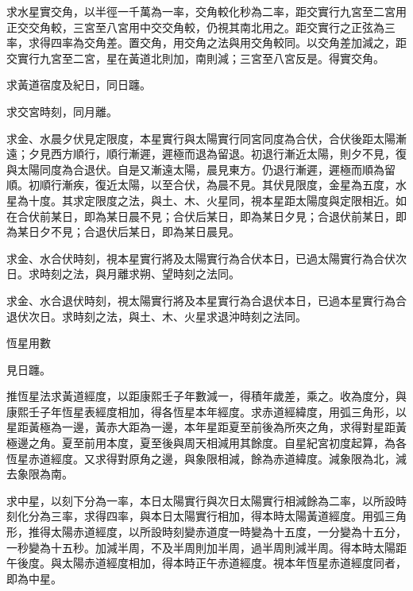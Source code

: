 \begin{pinyinscope}
求水星實交角，以半徑一千萬為一率，交角較化秒為二率，距交實行九宮至二宮用正交交角較，三宮至八宮用中交交角較，仍視其南北用之。距交實行之正弦為三率，求得四率為交角差。置交角，用交角之法與用交角較同。以交角差加減之，距交實行九宮至二宮，星在黃道北則加，南則減；三宮至八宮反是。得實交角。

求黃道宿度及紀日，同日躔。

求交宮時刻，同月離。

求金、水晨夕伏見定限度，本星實行與太陽實行同宮同度為合伏，合伏後距太陽漸遠；夕見西方順行，順行漸遲，遲極而退為留退。初退行漸近太陽，則夕不見，復與太陽同度為合退伏。自是又漸遠太陽，晨見東方。仍退行漸遲，遲極而順為留順。初順行漸疾，復近太陽，以至合伏，為晨不見。其伏見限度，金星為五度，水星為十度。其求定限度之法，與土、木、火星同，視本星距太陽度與定限相近。如在合伏前某日，即為某日晨不見；合伏后某日，即為某日夕見；合退伏前某日，即為某日夕不見；合退伏后某日，即為某日晨見。

求金、水合伏時刻，視本星實行將及太陽實行為合伏本日，已過太陽實行為合伏次日。求時刻之法，與月離求朔、望時刻之法同。

求金、水合退伏時刻，視太陽實行將及本星實行為合退伏本日，已過本星實行為合退伏次日。求時刻之法，與土、木、火星求退沖時刻之法同。

恆星用數

見日躔。

推恆星法求黃道經度，以距康熙壬子年數減一，得積年歲差，乘之。收為度分，與康熙壬子年恆星表經度相加，得各恆星本年經度。求赤道經緯度，用弧三角形，以星距黃極為一邊，黃赤大距為一邊，本年星距夏至前後為所夾之角，求得對星距黃極邊之角。夏至前用本度，夏至後與周天相減用其餘度。自星紀宮初度起算，為各恆星赤道經度。又求得對原角之邊，與象限相減，餘為赤道緯度。減象限為北，減去象限為南。

求中星，以刻下分為一率，本日太陽實行與次日太陽實行相減餘為二率，以所設時刻化分為三率，求得四率，與本日太陽實行相加，得本時太陽黃道經度。用弧三角形，推得太陽赤道經度，以所設時刻變赤道度一時變為十五度，一分變為十五分，一秒變為十五秒。加減半周，不及半周則加半周，過半周則減半周。得本時太陽距午後度。與太陽赤道經度相加，得本時正午赤道經度。視本年恆星赤道經度同者，即為中星。


\end{pinyinscope}